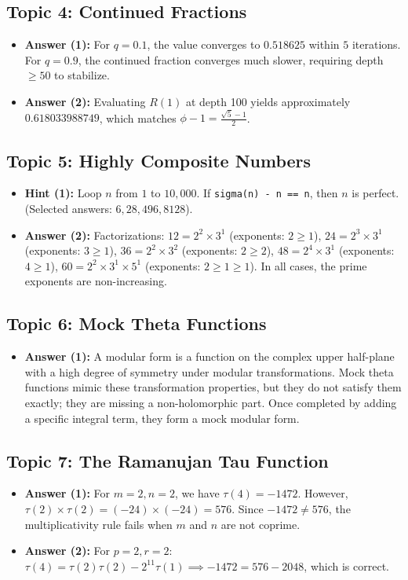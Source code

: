 \documentclass[11pt]{article}
\begin{document}
\subsection{Topic 4: Continued Fractions}
\begin{itemize}
    \item \textbf{Answer (1):} For $q=0.1$, the value converges to $0.518625$ within $5$ iterations. For $q=0.9$, the continued fraction converges much slower, requiring depth $\ge 50$ to stabilize.
    \item \textbf{Answer (2):} Evaluating $R(1)$ at depth 100 yields approximately $0.618033988749$, which matches $\phi - 1 = \frac{\sqrt{5}-1}{2}$.
\end{itemize}

\subsection{Topic 5: Highly Composite Numbers}
\begin{itemize}
    \item \textbf{Hint (1):} Loop $n$ from $1$ to $10,000$. If \texttt{sigma(n) - n == n}, then $n$ is perfect. (Selected answers: $6, 28, 496, 8128$).
    \item \textbf{Answer (2):} Factorizations:
    $12 = 2^2 \times 3^1$ (exponents: $2 \ge 1$),
    $24 = 2^3 \times 3^1$ (exponents: $3 \ge 1$),
    $36 = 2^2 \times 3^2$ (exponents: $2 \ge 2$),
    $48 = 2^4 \times 3^1$ (exponents: $4 \ge 1$),
    $60 = 2^2 \times 3^1 \times 5^1$ (exponents: $2 \ge 1 \ge 1$).
    In all cases, the prime exponents are non-increasing.
\end{itemize}

\subsection{Topic 6: Mock Theta Functions}
\begin{itemize}
    \item \textbf{Answer (1):} A modular form is a function on the complex upper half-plane with a high degree of symmetry under modular transformations. Mock theta functions mimic these transformation properties, but they do not satisfy them exactly; they are missing a non-holomorphic part. Once completed by adding a specific integral term, they form a mock modular form.
\end{itemize}

\subsection{Topic 7: The Ramanujan Tau Function}
\begin{itemize}
    \item \textbf{Answer (1):} For $m=2, n=2$, we have $\tau(4) = -1472$. However, $\tau(2) \times \tau(2) = (-24) \times (-24) = 576$. Since $-1472 \neq 576$, the multiplicativity rule fails when $m$ and $n$ are not coprime.
    \item \textbf{Answer (2):} For $p=2, r=2$: $\tau(4) = \tau(2)\tau(2) - 2^{11}\tau(1) \implies -1472 = 576 - 2048$, which is correct.
\end{itemize}
\end{document}
